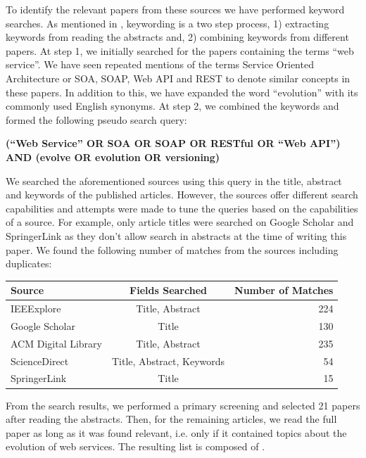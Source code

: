 \documentclass[runningheads,a4paper]{llncs}
\begin{document}
To identify the relevant papers from these sources we have performed keyword searches. As mentioned in \cite{petersen2008systematic}, keywording is a two step process, 1) extracting keywords from reading the abstracts and, 2) combining keywords from different papers. At step 1, we initially searched for the papers containing the terms ``web service''. We have seen repeated mentions of the terms Service Oriented Architecture or SOA, SOAP, Web API and REST to denote similar concepts in these papers. In addition to this, we have expanded the word ``evolution'' with its commonly used English synonyms. At step 2, we combined the keywords and formed the following pseudo search query:

\textbf{(``Web Service'' OR SOA OR SOAP OR RESTful OR ``Web API'')  AND (evolve OR evolution OR versioning)}

We searched the aforementioned sources using this query in the title, abstract and keywords of the published articles. However, the sources offer different search capabilities and attempts were made to tune the queries based on the capabilities of a source. For example, only article titles were searched on Google Scholar and SpringerLink as they don't allow search in abstracts at the time of writing this paper. We found the following number of matches from the sources including duplicates:

\begin{tabular}{l c r}
  Source & Fields Searched & Number of Matches \\
  \hline
  IEEExplore & Title, Abstract & 224 \\
  Google Scholar & Title & 130 \\
  ACM Digital Library & Title, Abstract & 235 \\
  ScienceDirect & Title, Abstract, Keywords & 54 \\
  SpringerLink & Title & 15
\end{tabular}

From the search results, we performed a primary screening and selected 21 papers after reading the abstracts. Then, for the remaining articles, we read the full paper as long as it was found relevant, i.e. only if it contained topics about the evolution of web services. The resulting list is composed of \cite{kitchenham2007guidelines} \cite{petersen2008systematic} \cite{treiber2009analyzing} \cite{borovskiy2008evolution} \cite{lublinsky2007versioning} \cite{laskey2008considerations} \cite{wilde2004semantically} \cite{leitner2008end} \cite{mangler2010origin} \cite{kaminski2006design} \cite{le2008synchronizing} \cite{aversano2005visualizing}.
\end{document}
